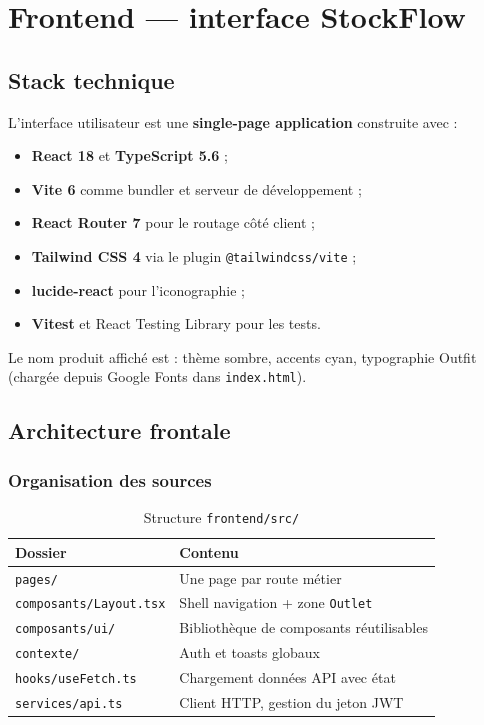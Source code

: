 \chapter{Frontend — interface StockFlow}
\label{ch:frontend}

\section{Stack technique}

L'interface utilisateur est une \textbf{single-page application} construite avec :
\begin{itemize}
  \item \textbf{React 18} et \textbf{TypeScript 5.6} ;
  \item \textbf{Vite 6} comme bundler et serveur de développement ;
  \item \textbf{React Router 7} pour le routage côté client ;
  \item \textbf{Tailwind CSS 4} via le plugin \texttt{@tailwindcss/vite} ;
  \item \textbf{lucide-react} pour l'iconographie ;
  \item \textbf{Vitest} et React Testing Library pour les tests.
\end{itemize}

Le nom produit affiché est \stockflow{} : thème sombre, accents cyan, typographie Outfit (chargée depuis Google Fonts dans \texttt{index.html}).

\section{Architecture frontale}

\subsection{Organisation des sources}

\begin{table}[htbp]
  \centering
  \caption{Structure \texttt{frontend/src/}}
  \label{tab:frontend-structure}
  \begin{tabular}{@{}lp{9cm}@{}}
    \toprule
    \textbf{Dossier} & \textbf{Contenu} \\
    \midrule
    \texttt{pages/} & Une page par route métier \\
    \texttt{composants/Layout.tsx} & Shell navigation + zone \texttt{Outlet} \\
    \texttt{composants/ui/} & Bibliothèque de composants réutilisables \\
    \texttt{contexte/} & Auth et toasts globaux \\
    \texttt{hooks/useFetch.ts} & Chargement données API avec état \\
    \texttt{services/api.ts} & Client HTTP, gestion du jeton JWT \\
    \bottomrule
  \end{tabular}
\end{table}

